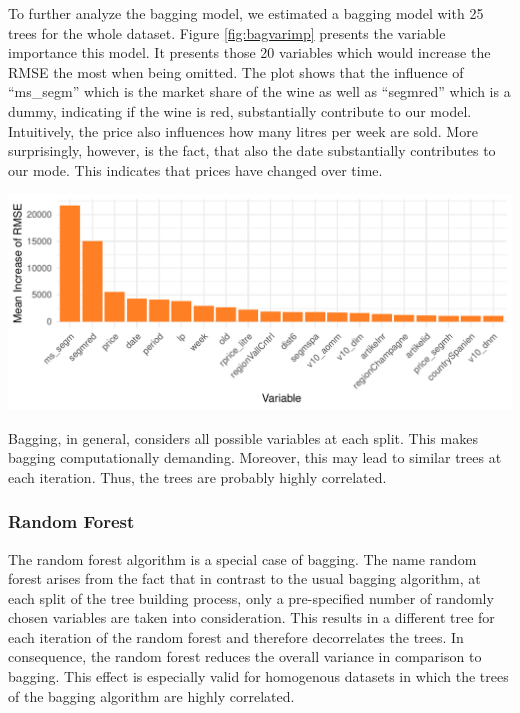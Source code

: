 \documentclass[11pt,]{article}
\let\origfigure\figure
\let\endorigfigure\endfigure
\renewenvironment{figure}[1][2] {
    \expandafter\origfigure\expandafter[H]
} {
    \endorigfigure
}
\begin{document}
To further analyze the \ac{bagging} model, we estimated a \ac{bagging}
model with 25 trees for the whole dataset. Figure \ref{fig:bagvarimp}
presents the variable importance this model. It presents those 20
variables which would increase the \ac{RMSE} the most when being
omitted. The plot shows that the influence of \enquote{ms\_segm} which
is the market share of the wine as well as \enquote{segmred} which is a
dummy, indicating if the wine is red, substantially contribute to our
model. Intuitively, the price also influences how many litres per week
are sold. More surprisingly, however, is the fact, that also the date
substantially contributes to our mode. This indicates that prices have
changed over time.

\begin{figure}

\includegraphics{../00_data/output_paper/15_var_imp_bagging} \hfill{}

\caption{\label{fig:bagvarimp}Bagging: Variable Importance.}\label{fig:bag_varimp}
\end{figure}

Bagging, in general, considers all possible variables at each split.
This makes \ac{bagging} computationally demanding. Moreover, this may
lead to similar trees at each iteration. Thus, the trees are probably
highly correlated.

\hypertarget{random-forest}{%
\subsubsection{\texorpdfstring{Random Forest
\label{chap:rand_for}}{Random Forest }}\label{random-forest}}

The random forest algorithm is a special case of \ac{bagging}. The name
random forest arises from the fact that in contrast to the usual
\ac{bagging} algorithm, at each split of the tree building process, only
a pre-specified number of randomly chosen variables are taken into
consideration. This results in a different tree for each iteration of
the random forest and therefore decorrelates the trees. In consequence,
the random forest reduces the overall variance in comparison to
\ac{bagging}. This effect is especially valid for homogenous datasets in
which the trees of the \ac{bagging} algorithm are highly correlated.
\end{document}
